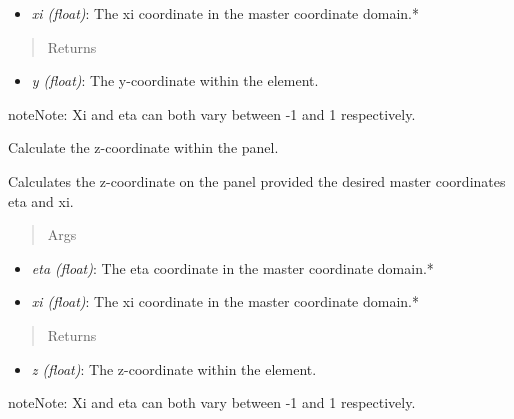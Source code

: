 \documentclass[letterpaper,10pt,english]{sphinxmanual}
\begin{document}
\begin{fulllineitems}
\begin{fulllineitems}
\begin{itemize}
\item {} 
\emph{xi (float)}: The xi coordinate in the master coordinate domain.*

\end{itemize}
\begin{quote}\begin{description}
\item[{Returns}] \leavevmode
\end{description}\end{quote}
\begin{itemize}
\item {} 
\emph{y (float)}: The y-coordinate within the element.

\end{itemize}

\begin{notice}{note}{Note:}
Xi and eta can both vary between -1 and 1 respectively.
\end{notice}

\end{fulllineitems}


\begin{fulllineitems}
\label{aerodynamics:AeroComBAT.Aerodynamics.CQUADA.z}
Calculate the z-coordinate within the panel.

Calculates the z-coordinate on the panel provided the desired master
coordinates eta and xi.
\begin{quote}\begin{description}
\item[{Args}] \leavevmode
\end{description}\end{quote}
\begin{itemize}
\item {} 
\emph{eta (float)}: The eta coordinate in the master coordinate domain.*

\item {} 
\emph{xi (float)}: The xi coordinate in the master coordinate domain.*

\end{itemize}
\begin{quote}\begin{description}
\item[{Returns}] \leavevmode
\end{description}\end{quote}
\begin{itemize}
\item {} 
\emph{z (float)}: The z-coordinate within the element.

\end{itemize}

\begin{notice}{note}{Note:}
Xi and eta can both vary between -1 and 1 respectively.
\end{notice}

\end{fulllineitems}


\end{fulllineitems}
\end{document}
